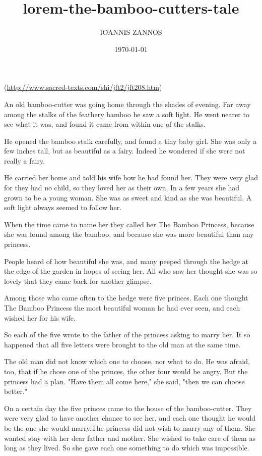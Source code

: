 \documentclass{article}
\author{IOANNIS ZANNOS}
\date{\today}
\title{lorem-the-bamboo-cutters-tale}
\begin{document}
\maketitle
\tableofcontents

(\url{http://www.sacred-texts.com/shi/jft2/jft208.htm})


An old bamboo-cutter was going home through the shades of evening. Far away among the stalks of the feathery bamboo he saw a soft light. He went nearer to see what it was, and found it came from within one of the stalks.

He opened the bamboo stalk carefully, and found a tiny baby girl. She was only a few inches tall, but as beautiful as a fairy. Indeed he wondered if she were not really a fairy.


He carried her home and told his wife how he had found her. They were very glad for they had no child, so they loved her as their own. In a few years she had grown to be a young woman. She was as sweet and kind as she was beautiful. A soft light always seemed to follow her.

When the time came to name her they called her The Bamboo Princess, because she was found among the bamboo, and because she was more beautiful than any princess.

People heard of how beautiful she was, and many peeped through the hedge at the edge of the garden in hopes of seeing her. All who saw her thought she was so lovely that they came back for another glimpse.

Among those who came often to the hedge were five princes. Each one thought The Bamboo Princess the most beautiful woman he had ever seen, and each wished her for his wife.

So each of the five wrote to the father of the princess asking to marry her. It so happened that all five letters were brought to the old man at the same time.

The old man did not know which one to choose, nor what to do. He was afraid, too, that if he chose one of the princes, the other four would be angry. But the princess had a plan. "Have them all come here," she said, "then we can choose better."

On a certain day the five princes came to the house of the bamboo-cutter. They were very glad to have another chance to see her, and each one thought he would be the one she would marry.The princess did not wish to marry any of them. She wanted stay with her dear father and mother. She wished to take care of them as long as they lived. So she gave each one something to do which was impossible.
\end{document}
